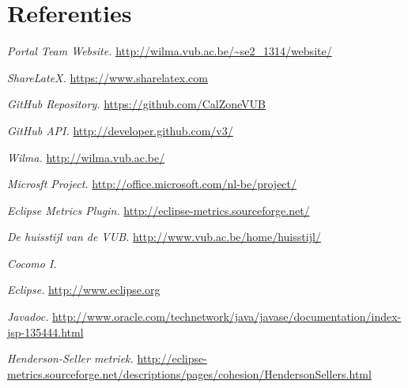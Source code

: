 \chapter{Referenties}
\begingroup
\renewcommand{\chapter}[2]{}%
\begin{thebibliography}{99}

     \emph{Portal Team Website.} \url{http://wilma.vub.ac.be/~se2_1314/website/}
    
     \emph{ShareLateX.} \url{https://www.sharelatex.com}
    
     \emph{GitHub Repository.} \url{https://github.com/CalZoneVUB}
    
     \emph{GitHub API.} \url{http://developer.github.com/v3/}
    
     \emph{Wilma.} \url{http://wilma.vub.ac.be/}
    
     \emph{Microsft Project.} \url{http://office.microsoft.com/nl-be/project/}
    
    
     \emph{Eclipse Metrics Plugin.} \url{http://eclipse-metrics.sourceforge.net/}
    
     \emph{De huisstijl van de VUB.} \url{http://www.vub.ac.be/home/huisstijl/}

	 \emph{Cocomo I.} 

     \emph{Eclipse.} \url{http://www.eclipse.org}
    
     \emph{Javadoc.} \url{http://www.oracle.com/technetwork/java/javase/documentation/index-jsp-135444.html}

		 \emph{Henderson-Seller metriek.} \url{http://eclipse-metrics.sourceforge.net/descriptions/pages/cohesion/HendersonSellers.html}





\end{thebibliography}


\endgroup